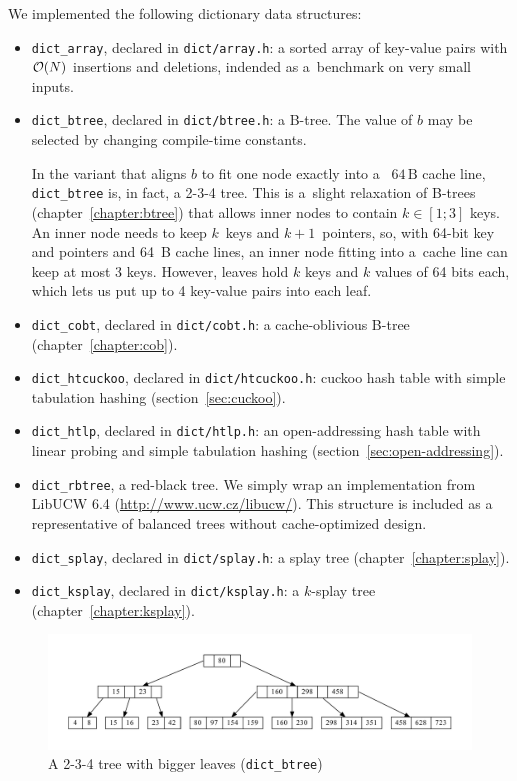 We implemented the following dictionary data structures:
\begin{itemize}
\item \texttt{dict\_array}, declared in \texttt{dict/array.h}:
	a sorted array of key-value pairs with $\mathcal{O}(N)$ insertions and deletions,
	indended as a~benchmark on very small inputs.
\item \texttt{dict\_btree}, declared in \texttt{dict/btree.h}:
	a B-tree. The value of $b$ may be selected by changing compile-time
	constants.

	In the variant that aligns $b$ to fit one node exactly into a~
	$64\,\text{B}$ cache line, \texttt{dict\_btree} is, in fact, a 2-3-4
	tree.
	This is a~slight relaxation of B-trees (chapter~\ref{chapter:btree})
	that allows inner nodes to contain $k\in[1;3]$ keys.
	An inner node needs to keep $k$~keys and $k+1$~pointers, so, with
	64-bit key and pointers and 64~B cache lines, an inner node fitting
	into a~cache line can keep at most 3 keys. However, leaves hold $k$
	keys and $k$ values of 64 bits each, which lets us put up to
	4 key-value pairs into each leaf.
\item \texttt{dict\_cobt}, declared in \texttt{dict/cobt.h}:
	a cache-oblivious B-tree (chapter~\ref{chapter:cob}).
\item \texttt{dict\_htcuckoo}, declared in \texttt{dict/htcuckoo.h}:
	cuckoo hash table with simple tabulation hashing
	(section~\ref{sec:cuckoo}).
\item \texttt{dict\_htlp}, declared in \texttt{dict/htlp.h}:
	an open-addressing hash table with linear probing and simple tabulation
	hashing (section~\ref{sec:open-addressing}).
\item \texttt{dict\_rbtree}, a red-black tree. We simply wrap an implementation
	from LibUCW 6.4 (\url{http://www.ucw.cz/libucw/}).
	This structure is included as a representative of balanced trees
	without cache-optimized design.
\item \texttt{dict\_splay}, declared in \texttt{dict/splay.h}:
	a splay tree (chapter~\ref{chapter:splay}).
\item \texttt{dict\_ksplay}, declared in \texttt{dict/ksplay.h}:
	a $k$-splay tree (chapter~\ref{chapter:ksplay}). %
\end{itemize}

\begin{figure}
\centering
\includegraphics[width=\linewidth]{img/btree}
\caption{A 2-3-4 tree with bigger leaves (\texttt{dict\_btree})}
\end{figure}

